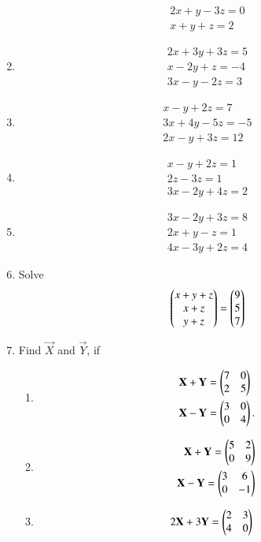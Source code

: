 \begin{enumerate}[label=\thesubsection.\arabic*,ref=\thesubsection.\theenumi]
\begin{align}
 2x+y-3z = 0\\
 x+y+z = 2
\end{align}
\item
\begin{align}
 2x+3y+3z = 5\\
 x-2y+z = -4\\
 3x-y-2z = 3
\end{align}
\item   \label{prob:14}
\begin{align}
 x-y+2z = 7\\
 3x+4y-5z = -5\\
 2x-y+3z = 12
\end{align}
\item  
\begin{align}
x-y+2z=1\\ 2z-3z=1\\ 3x-2y+4z=2
\end{align}
\item 
\begin{align}
3x-2y+3z=8\\ 2x+y-z=1\\ 4x-3y+2z=4
\end{align}
\item Solve
\begin{align}
\begin{pmatrix}x+y+z \\ x+z \\ y+z \end{pmatrix}=
\begin{pmatrix}9 \\ 5 \\  7\end{pmatrix}
\end{align}
\item Find $\vec{X}$ and $\vec{Y}$, if
\begin{enumerate}
\item 
\begin{align}
	\mathbf{X}+\mathbf{Y}&= \begin{pmatrix}7 & 0 \\ 2 & 5\end{pmatrix} 
\\
		\mathbf{X}-\mathbf{Y}&=\begin{pmatrix}3 & 0 \\ 0 & 4\end{pmatrix}.
\end{align}
\item  
\begin{align}
\mathbf{X}+\mathbf{Y}=\begin{pmatrix}5&2\\0&9\end{pmatrix}
	\\
\mathbf{X}-\mathbf{Y}=\begin{pmatrix}3&6\\0&-1\end{pmatrix}
\end{align}
\item 
\begin{align}
	2\vec{X}+3\vec{Y}&=\myvec
{2 & 3 \\ 4 & 0}  

\end{align}
\end{enumerate}
\end{enumerate}
